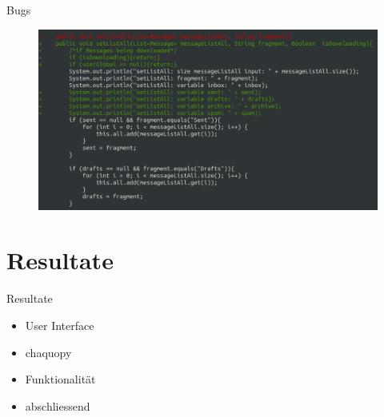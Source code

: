 \documentclass[aspectratio=169]{beamer}
\begin{document}
\begin{frame}[plain]{Bugs}
    \begin{figure}[h]
        \includegraphics[width=.8\textwidth]{media/bug.png}
    \end{figure}
\end{frame}


\section{Resultate}
\begin{frame}[plain]{Resultate}
\begin{itemize}\pause
    \item User Interface\pause
    \item chaquopy\pause
    \item Funktionalität\pause
    \item abschliessend
\end{itemize}
\end{frame}
\end{document}
